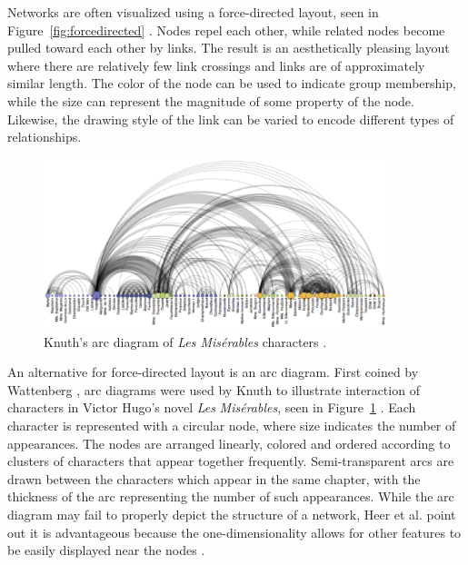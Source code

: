 \documentclass{article}
\begin{document}
Networks are often visualized using a force-directed layout, seen in Figure~\ref{fig:forcedirected} \cite{Heer:2010:TTV:1743546.1743567}.  Nodes repel each other, while related nodes become pulled toward each other by links.  The result is an aesthetically pleasing layout where there are relatively few link crossings and links are of approximately similar length.  The color of the node can be used to indicate group membership, while the size can represent the magnitude of some property of the node.  Likewise, the drawing style of the link can be varied to encode different types of relationships. 

\begin{figure}[h]
	\centering
	\includegraphics[width=10cm]{figures/arcdiagram.eps}
	\caption{Knuth's arc diagram of \textit{Les Mis\'erables} characters \cite{Knuth:1993:SGP:164984}.}
	\label{fig:arcdiagram}
\end{figure}

An alternative for force-directed layout is an arc diagram.  First coined by Wattenberg \cite{Wattenberg:2002:ADV:857191.857733}, arc diagrams were used by Knuth to illustrate interaction of characters in Victor Hugo's novel \textit{Les} \textit{Mis\'erables}, seen in Figure~\ref{fig:arcdiagram} \cite{Knuth:1993:SGP:164984}.  Each character is represented with a circular node, where size indicates the number of appearances.  The nodes are arranged linearly, colored and ordered according to clusters of characters that appear together frequently.  Semi-transparent arcs are drawn between the characters which appear in the same chapter, with the thickness of the arc representing the number of such appearances.  While the arc diagram may fail to properly depict the structure of a network, Heer et al. point out it is advantageous because the one-dimensionality allows for other features to be easily displayed near the nodes \cite{Heer:2010:TTV:1743546.1743567}.  %
\end{document}
